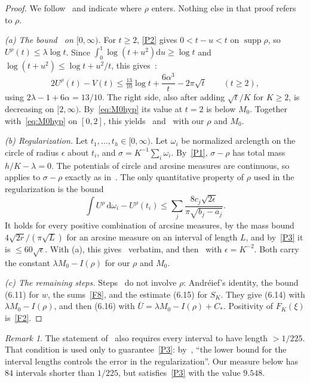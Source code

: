 \documentclass[11pt]{article}
\theoremstyle{remark}
\newtheorem{remark}{Remark}
\newcommand{\Ubar}{\overline{U}}
\newcommand{\dd}{\mathrm{d}}
\newcommand{\Cstar}{C_{*}}
\DeclareMathOperator{\supp}{supp}
\begin{document}
\begin{proof}
We follow~\cite[\S6.1--6.2]{F} and indicate where $\rho$ enters. Nothing else in that proof refers to $\rho$.

\emph{(a) The bound~\cite[(6.2)]{F} on $[0,\infty)$.} For $t\ge2$, \ref{P2} gives $0<t-u<t$ on $\supp\rho$, so $U^\rho(t)\le\lambda\log t$. Since $\int_0^1\log(t+u^2)\dd u\ge\log t$ and $\log(t+u^2)\le\log t+u^2/t$, this gives~\cite[(6.8)]{F}:
\[
2U^\rho(t)-V(t)\le\tfrac{13}{10}\log t+\frac{6\alpha^3}{t}-2\pi\sqrt t\qquad(t\ge2),
\]
using $2\lambda-1+6\alpha=13/10$. The right side, also after adding $\sqrt t/K$ for $K\ge2$, is decreasing on $[2,\infty)$. By~\eqref{eq:M0hyp} its value at $t=2$ is below $M_0$. Together with~\eqref{eq:M0hyp} on $[0,2]$, this yields~\cite[(6.2)]{F} and~\cite[(6.7)]{F} with our $\rho$ and $M_0$.

\emph{(b) Regularization.} Let $t_1,\dots,t_h\in[0,\infty)$. Let $\omega_i$ be normalized arclength on the circle of radius $\epsilon$ about $t_i$, and $\sigma=K^{-1}\sum_i\omega_i$. By~\ref{P1}, $\sigma-\rho$ has total mass $h/K-\lambda=0$. The potentials of circle and arcsine measures are continuous, so~\cite[Lemma~6.2]{F} applies to $\sigma-\rho$ exactly as in~\cite[p.~18]{F}. The only quantitative property of $\rho$ used in the regularization is the bound~\cite[p.~19]{F}
\[
\int U^\rho\,\dd\omega_i-U^\rho(t_i)\le\sum_j\frac{8c_j\sqrt{2\epsilon}}{\pi\sqrt{b_j-a_j}}.
\]
It holds for every positive combination of arcsine measures, by the mass bound $4\sqrt{2r}/(\pi\sqrt L)$ for an arcsine measure on an interval of length $L$, and by~\ref{P3} it is $\le60\sqrt\epsilon$. With (a), this gives~\cite[(6.6)]{F} verbatim, and then~\cite[(6.9)]{F} with $\epsilon=K^{-2}$. Both carry the constant $\lambda M_0-I(\rho)$ for our $\rho$ and $M_0$.

\emph{(c) The remaining steps.} Steps~\cite[(6.10)--(6.15)]{F} do not involve $\rho$: Andr\'eief's identity, the bound (6.11) for $w$, the sums~\ref{F8}, and the estimate (6.15) for $S_K$. They give (6.14) with $\lambda M_0-I(\rho)$, and then (6.16) with $\Ubar=\lambda M_0-I(\rho)+\Cstar$. Positivity of $F_K(\xi)$ is~\ref{F2}.
\end{proof}

\begin{remark}\label{rem:225}
The statement of~\cite[Lemma~6.1]{F} also requires every interval to have length $>1/225$. That condition is used only to guarantee~\ref{P3}: by~\cite[p.~17]{F}, ``the lower bound for the interval lengths controls the error in the regularization''. Our measure below has $84$ intervals shorter than $1/225$, but satisfies~\ref{P3} with the value $9.548$.
\end{remark}
\end{document}
